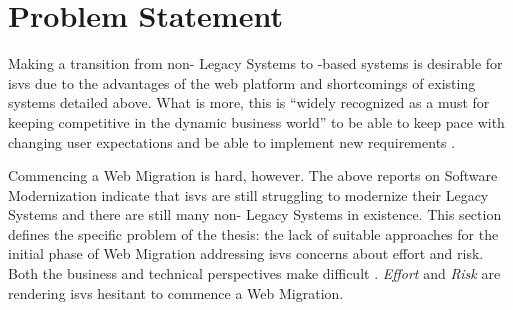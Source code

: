 \vspace{-15pt}
\hypertarget{sec:problem}{%
\section{Problem Statement}\label{sec:problem}}
\vspace{15pt}

Making a transition from non- \glspl{Legacy System} to -based systems is desirable for \glspl{isv} due to the advantages of the \Gls{web} platform and shortcomings of existing systems detailed above.
What is more, this is ``widely recognized as a must for keeping competitive in the dynamic business world'' \autocite{Aversano2001} to be able to keep pace with changing user expectations and be able to implement new requirements \autocite{Fuhr2013SOAMIG,Lucia2008}.

Commencing a \gls{Web Migration} is hard, however.
The above reports on \gls{Software Modernization} indicate that \glspl{isv} are still struggling to modernize their \glspl{Legacy System} and there are still many non- \glspl{Legacy System} in existence.
This section defines the specific problem of the thesis: the lack of suitable approaches for the initial phase of \gls{Web Migration} addressing \glspl{isv} concerns about effort and risk.
Both the business and technical perspectives make  difficult \autocite{Khadka2014ProfessionalsModernization}.
\emph{Effort} and \emph{Risk} \autocite{Heil2018ReWaMP,Khadka2014ProfessionalsModernization,Canfora2000Decomposing,Bisbal1999LegacyInformationSystems} are rendering \glspl{isv} hesitant to commence a \gls{Web Migration}.

